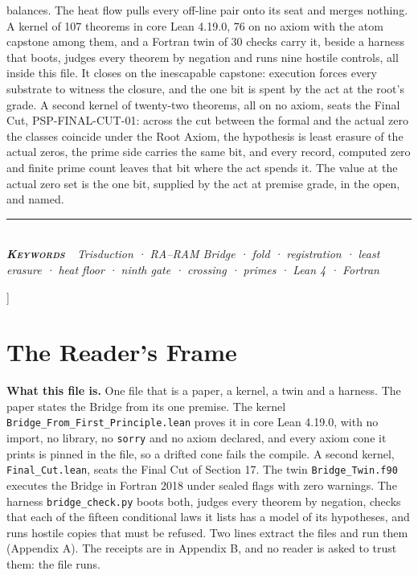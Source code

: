 \documentclass[10pt,twocolumn]{article}
\begin{document}
{\begin{minipage}{\textwidth}
{balances. The heat flow pulls every off-line pair onto its seat and
merges nothing. A kernel of 107 theorems in core Lean 4.19.0, 76 on no
axiom with the atom capstone among them, and a Fortran twin of 30 checks
carry it, beside a harness that boots, judges every theorem by negation
and runs nine hostile controls, all inside this file. It closes on the
inescapable capstone: execution forces every substrate to witness the
closure, and the one bit is spent by the act at the root's grade. A
second kernel of twenty-two theorems, all on no axiom, seats the Final
Cut, PSP-FINAL-CUT-01: across the cut between the formal and the actual
zero the classes coincide under the Root Axiom, the hypothesis is least
erasure of the actual zeros, the prime side carries the same bit, and
every record, computed zero and finite prime count leaves that bit where
the act spends it. The value at the actual zero set is the one bit,
supplied by the act at premise grade, in the open, and named.}\\[4pt]
{\color{accent}\rule{\textwidth}{0.6pt}}\\[3pt]
{\itshape\footnotesize\color{faint}\textbf{\upshape\scshape\color{deep}Keywords\ }\ Trisduction
· RA--RAM Bridge · fold · registration · least erasure · heat floor ·
ninth gate · crossing · primes · Lean 4 · Fortran}\\[12pt]
\end{minipage}
}]
\thispagestyle{fancy}
\hypertarget{the-readers-frame}{%
\section{The Reader's Frame}\label{the-readers-frame}}

\textbf{What this file is.} One file that is a paper, a kernel, a twin
and a harness. The paper states the Bridge from its one premise. The
kernel \texttt{Bridge\_\allowbreak{}From\_\allowbreak{}First\_\allowbreak{}Principle.lean} proves it in core
Lean 4.19.0, with no import, no library, no \texttt{sorry} and no axiom
declared, and every axiom cone it prints is pinned in the file, so a
drifted cone fails the compile. A second kernel,
\texttt{Final\_\allowbreak{}Cut.lean}, seats the Final Cut of Section 17. The twin
\texttt{Bridge\_\allowbreak{}Twin.f90} executes the Bridge in Fortran 2018 under
sealed flags with zero warnings. The harness \texttt{bridge\_\allowbreak{}check.py}
boots both, judges every theorem by negation, checks that each of the
fifteen conditional laws it lists has a model of its hypotheses, and
runs hostile copies that must be refused. Two lines extract the files
and run them (Appendix A). The receipts are in Appendix B, and no reader
is asked to trust them: the file runs.
\end{document}
